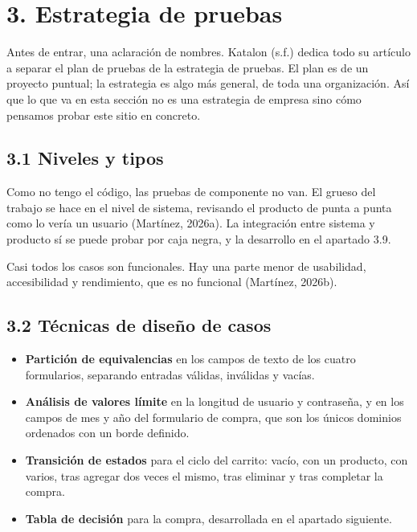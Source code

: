 \documentclass[11pt,a4paper]{article}
\begin{document}
\FloatBarrier
\section*{3. Estrategia de pruebas}

Antes de entrar, una aclaración de nombres. Katalon (s.f.) dedica todo su artículo a
separar el plan de pruebas de la estrategia de pruebas. El plan es de un proyecto
puntual; la estrategia es algo más general, de toda una organización. Así que lo que
va en esta sección no es una estrategia de empresa sino cómo pensamos probar este
sitio en concreto.

\subsection*{3.1 Niveles y tipos}

Como no tengo el código, las pruebas de componente no van. El grueso del trabajo se
hace en el nivel de sistema, revisando el producto de punta a punta como lo vería un
usuario (Martínez, 2026a). La integración entre sistema y producto sí se puede
probar por caja negra, y la desarrollo en el apartado 3.9.

Casi todos los casos son funcionales. Hay una parte menor de usabilidad,
accesibilidad y rendimiento, que es no funcional (Martínez, 2026b).

\subsection*{3.2 Técnicas de diseño de casos}

\begin{itemize}
  \item \textbf{Partición de equivalencias} en los campos de texto de los cuatro
        formularios, separando entradas válidas, inválidas y vacías.
  \item \textbf{Análisis de valores límite} en la longitud de usuario y
        contraseña, y en los campos de mes y año del formulario de compra, que son
        los únicos dominios ordenados con un borde definido.
  \item \textbf{Transición de estados} para el ciclo del carrito: vacío, con un
        producto, con varios, tras agregar dos veces el mismo, tras eliminar y tras
        completar la compra.
  \item \textbf{Tabla de decisión} para la compra, desarrollada en el apartado
        siguiente.
\end{itemize}
\end{document}

